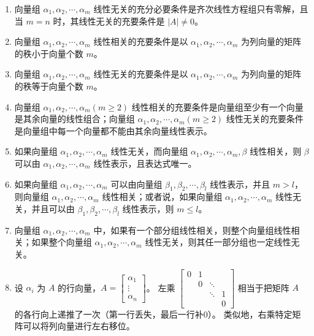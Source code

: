 \documentclass[UTF8]{ctexart}
\theoremstyle{mydef}
\begin{document}
\begin{enumerate}
\begin{enumerate}
        $$
        \begin{cases}
        a_{11}x_1 + a_{12}x_2 + \cdots + a_{1m}x_m = 0 \\
        a_{21}x_1 + a_{22}x_2 + \cdots + a_{2m}x_m = 0 \\
        \cdots \cdots \cdots \cdots \cdots \cdots \\
        a_{n1}x_1 + a_{n2}x_2 + \cdots + a_{nm}x_m = 0
        \end{cases}
        $$
        有非零解。且当 $m=n$ 时，其线性相关的充要条件是 $|A| = 0$。
        \item 向量组 $\alpha_1, \alpha_2, \cdots, \alpha_m$ 线性无关的充分必要条件是齐次线性方程组只有零解，且当 $m=n$ 时，其线性无关的充要条件是 $|A| \neq 0$。
        \item 向量组 $\alpha_1, \alpha_2, \cdots, \alpha_m$ 线性相关的充要条件是以 $\alpha_1, \alpha_2, \cdots, \alpha_m$ 为列向量的矩阵的秩小于向量个数 $m$。
        \item 向量组 $\alpha_1, \alpha_2, \cdots, \alpha_m$ 线性无关的充要条件是以 $\alpha_1, \alpha_2, \cdots, \alpha_m$ 为列向量的矩阵的秩等于向量个数 $m$。
        \item 向量组 $\alpha_1, \alpha_2, \cdots, \alpha_m (m \ge 2)$ 线性相关的充要条件是向量组至少有一个向量是其余向量的线性组合；向量组 $\alpha_1, \alpha_2, \cdots, \alpha_m (m \ge 2)$ 线性无关的充要条件是向量组中每一个向量都不能由其余向量线性表示。
        \item 如果向量组 $\alpha_1, \alpha_2, \cdots, \alpha_m$ 线性无关，而向量组 $\alpha_1, \alpha_2, \cdots, \alpha_m, \beta$ 线性相关，则 $\beta$ 可以由 $\alpha_1, \alpha_2, \cdots, \alpha_m$ 线性表示，且表达式唯一。
        \item 如果向量组 $\alpha_1, \alpha_2, \cdots, \alpha_m$ 可以由向量组 $\beta_1, \beta_2, \cdots, \beta_l$ 线性表示，并且 $m > l$，则向量组 $\alpha_1, \alpha_2, \cdots, \alpha_m$ 线性相关；或者说，如果向量组 $\alpha_1, \alpha_2, \cdots, \alpha_m$ 线性无关，并且可以由 $\beta_1, \beta_2, \cdots, \beta_l$ 线性表示，则 $m \le l$。
        \item 向量组 $\alpha_1, \alpha_2, \cdots, \alpha_m$ 中，如果有一个部分组线性相关，则整个向量组线性相关；如果整个向量组 $\alpha_1, \alpha_2, \cdots, \alpha_m$ 线性无关，则其任一部分组也一定线性无关。
        \item 设 $\alpha_i$ 为 $A$ 的行向量，$A = \begin{bmatrix} \alpha_1 \\ \vdots \\ \alpha_n \end{bmatrix}$。
    左乘 $\begin{bmatrix} 0 & 1 & & \\ & 0 & \ddots & \\ & & \ddots & 1 \\ & & & 0 \end{bmatrix}$ 相当于把矩阵 $A$ 的各行向上递推了一次（第一行丢失，最后一行补0）。
    类似地，右乘特定矩阵可以将列向量进行左右移位。
    \end{enumerate}
\end{enumerate}
\end{document}
